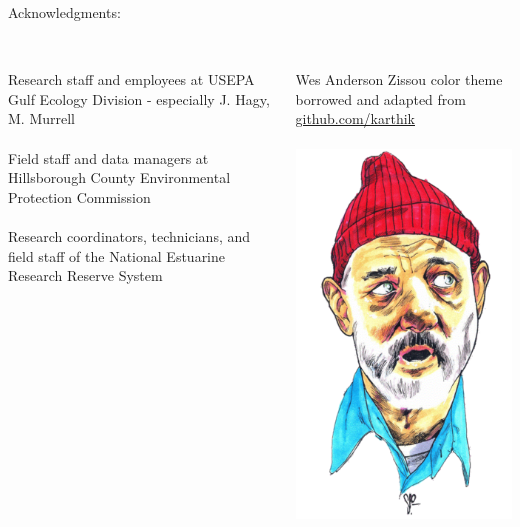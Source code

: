 \documentclass[serif]{beamer}\usepackage[]{graphicx}\usepackage[]{color}
\begin{document}
\begin{frame}
Acknowledgments:\\~\\
\begin{columns}
\begin{column}{0.6\textwidth}
{\footnotesize
Research staff and employees at USEPA Gulf Ecology Division - especially J. Hagy, M. Murrell\\~\\
Field staff and data managers at Hillsborough County Environmental Protection Commission\\~\\
Research coordinators, technicians, and field staff of the National Estuarine Research Reserve System}\\~\\
\end{column}
\begin{column}{0.3\textwidth}
\vspace{-0.2in}
\begin{center}
{\tiny
Wes Anderson Zissou color theme borrowed and adapted from \href{https://github.com/karthik/wesanderson}{github.com/karthik}\\~\\
\includegraphics[width=0.55\linewidth]{fig/zissou.png}\\~\\
\vspace{-0.15in}
}
\end{center}
\end{column}
\end{columns}
\end{frame}
\end{document}
